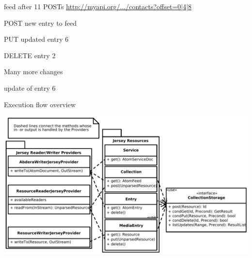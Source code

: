 \documentclass{beamer}
\begin{document}
\begin{frame}[t]{feed after 11 POSTs}
\feedspicture
{     }
{       }
{      }
\url{http://myapi.org/.../contacts?offset=0|4|8}
\end{frame}

\begin{frame}[t]{POST new entry to feed}
\feedspicture
{     }
{        }
{        }
\end{frame}

\begin{frame}[t]{PUT updated entry 6}
\feedspicture
{     }
{       }
{       }
\end{frame}

\begin{frame}[t]{DELETE entry 2}
\feedspicture
{       }
{       }
{        }
\end{frame}

\begin{frame}[t]{Many more changes}
\feedspicture
{       }
{       }
{        }
\end{frame}

\begin{frame}[t]{update of entry 6}
\feedspicture
{       }
{      }
{      }
\end{frame}

\begin{frame}{Execution flow overview}
  \begin{center}
    \includegraphics[width=1\textwidth]{images/executionflowoverview}
  \end{center}
\end{frame}
\end{document}
